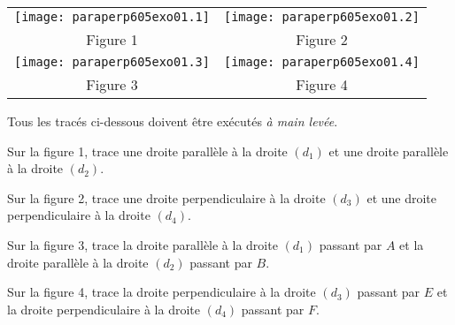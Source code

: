 \begin{center}
  \begin{tabular}{|c|c|}
\hline
\texttt{[image: paraperp605exo01.1]}&\texttt{[image: paraperp605exo01.2]}\\
Figure 1&Figure 2\\
\hline
\texttt{[image: paraperp605exo01.3]}&\texttt{[image: paraperp605exo01.4]}\\
Figure 3&Figure 4\\
\hline
  \end{tabular}
\end{center}
Tous les tracés ci-dessous doivent être exécutés {\em à main levée}.
\begin{myenumerate}
\item Sur la figure 1, trace une droite parallèle à la droite $(d_1)$
et une droite parallèle à la droite $(d_2)$.
\item Sur la figure 2, trace une droite perpendiculaire à la droite
$(d_3)$ et une droite perpendiculaire à la droite $(d_4)$.
\item Sur la figure 3, trace la droite parallèle à la droite $(d_1)$
passant par $A$ et la droite parallèle à la droite $(d_2)$ passant par
$B$.
\item Sur la figure 4, trace la droite perpendiculaire à la droite
$(d_3)$ passant par $E$ et la droite perpendiculaire à la droite
$(d_4)$ passant par $F$.
\end{myenumerate}
